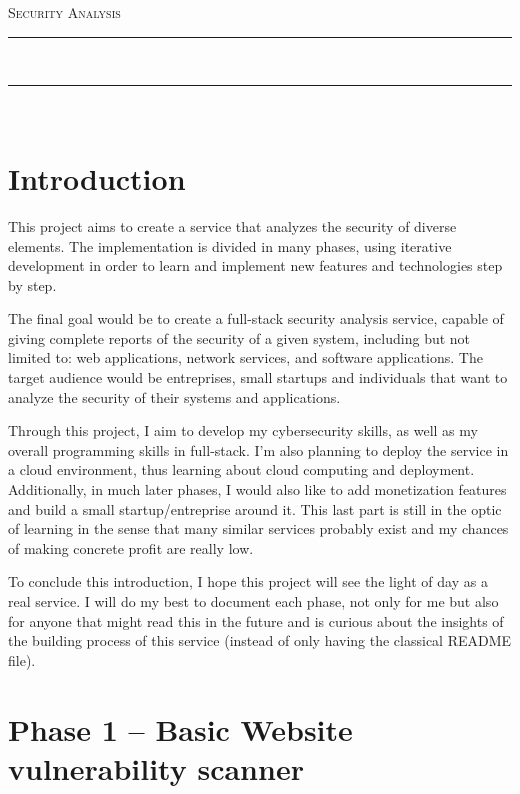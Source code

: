 \documentclass[12pt]{article}
\newcommand{\HRule}{\rule{\linewidth}{0.3mm}}
\begin{document}
\clearpage

\textsc{\huge Security Analysis}\\[1cm]

\HRule \\[0.7cm]

\HRule \\[1.2cm]
\vspace{1cm}


\vfill



\clearpage


\tableofcontents
\newpage


\section{Introduction}

This project aims to create a service that analyzes the security of diverse
elements. The implementation is divided in many phases, using iterative development
in order to learn and implement new features and technologies step by step.

The final goal would be to create a full-stack security analysis service, capable of
giving complete reports of the security of a given system, including but not limited
to: web applications, network services, and software applications. The target audience
would be entreprises, small startups and individuals that want to analyze the security of their systems and applications.

Through this project, I aim to develop my cybersecurity skills, as well as my
overall programming skills in full-stack. I'm also planning to deploy the service
in a cloud environment, thus learning about cloud computing and deployment.
Additionally, in much later phases, I would also like to add monetization features
and build a small startup/entreprise around it. This last part is still in the optic
of learning in the sense that many similar services probably exist and my chances
of making concrete profit are really low.

To conclude this introduction, I hope this project will see the light of day as a
real service. I will do my best to document each phase, not only for me but also for
anyone that might read this in the future and is curious about the insights of the
building process of this service (instead of only having the classical README file).

\section{Phase 1 -- Basic Website vulnerability scanner}
\end{document}
